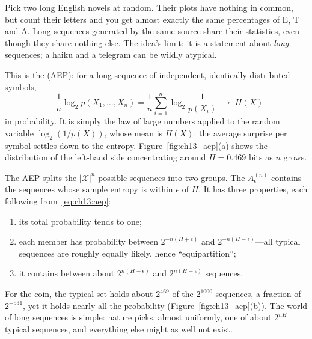 \begin{analogy}
Pick two long English novels at random. Their plots have nothing in common, but count their
letters and you get almost exactly the same percentages of E, T and A. Long sequences generated by
the same source share their statistics, even though they share nothing else. The idea's limit:
it is a statement about \emph{long} sequences; a haiku and a telegram can be wildly atypical.
\end{analogy}

This is the  (AEP): for a long sequence of independent,
identically distributed symbols,
\begin{equation}
-\frac1n\log_2p(X_1,\ldots,X_n)=\frac1n\sum_{i=1}^n\log_2\frac1{p(X_i)}\;\longrightarrow\;H(X)
\label{eq:ch13:aep}
\end{equation}
in probability. It is simply the law of large numbers applied to the random variable
$\log_2(1/p(X))$, whose mean is $H(X)$: the average surprise per symbol settles down to the
entropy. Figure~\ref{fig:ch13_aep}(a) shows the distribution of the left-hand side concentrating
around $H=0.469$ bits as $n$ grows.


The AEP splits the $|\mathcal{X}|^n$ possible sequences into two groups. The 
$A_\epsilon^{(n)}$ contains the sequences whose sample entropy is within $\epsilon$ of $H$. It has
three properties, each following from~\eqref{eq:ch13:aep}:
\begin{enumerate}
\item its total probability tends to one;
\item each member has probability between $2^{-n(H+\epsilon)}$ and $2^{-n(H-\epsilon)}$---all
typical sequences are roughly equally likely, hence ``equipartition'';
\item it contains between about $2^{n(H-\epsilon)}$ and $2^{n(H+\epsilon)}$ sequences.
\end{enumerate}
For the coin, the typical set holds about $2^{469}$ of the $2^{1000}$ sequences, a fraction of
$2^{-531}$, yet it holds nearly all the probability (Figure~\ref{fig:ch13_aep}(b)). The world of
long sequences is simple: nature picks, almost uniformly, one of about $2^{nH}$ typical sequences,
and everything else might as well not exist.

